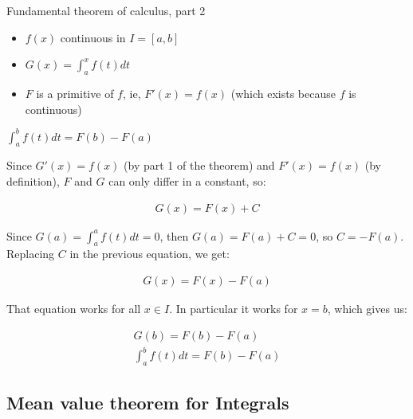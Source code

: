 \begin{property}{Fundamental theorem of calculus, part 2}
\begin{precondition}
\begin{itemize}
    \item $f(x)$ continuous in $I=[a,b]$
    \item $G(x)=\int_a^x f(t) dt$
    \item $F$ is a primitive of $f$, ie, $F'(x) =f(x)$ (which exists because $f$ is continuous)
\end{itemize}
\end{precondition}
\begin{claim}
    $\int_a^b f(t) dt = F(b)-F(a)$
\end{claim}
\begin{Proof}

Since $G'(x)=f(x)$ (by part 1 of the theorem) and $F'(x)= f(x)$ (by definition), $F$ and $G$ can only differ in a constant, so:

\begin{align*}
G(x)= F(x)+C
\end{align*}

Since $G(a)= \int_a^a f(t) dt = 0$, then $G(a)= F(a)+C =0$,  so $C=-F(a)$. Replacing $C$ in the previous equation, we get:

\begin{align*}
G(x)= F(x)-F(a)
\end{align*}

That equation works for all $x ∈ I$. In particular it works for $x=b$, which gives us:

\begin{align*}
G(b)= F(b)-F(a)
\\ \int_a^b f(t) dt= F(b)-F(a)
\end{align*}

\end{Proof}
\end{property}



\subsection{Mean value theorem for Integrals}

